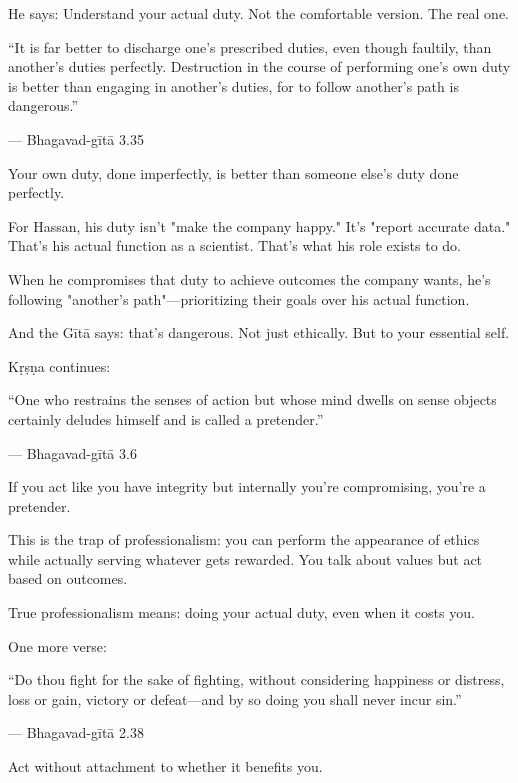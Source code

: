 \documentclass[11pt,twoside]{book}
\begin{document}
He says: Understand your actual duty. Not the comfortable version. The real one.

\begin{pullquote}
``It is far better to discharge one's prescribed duties, even though faultily, than another's duties perfectly. Destruction in the course of performing one's own duty is better than engaging in another's duties, for to follow another's path is dangerous.''

--- Bhagavad-gītā 3.35
\end{pullquote}

Your own duty, done imperfectly, is better than someone else's duty done perfectly.

For Hassan, his duty isn't "make the company happy." It's "report accurate data." That's his actual function as a scientist. That's what his role exists to do.

When he compromises that duty to achieve outcomes the company wants, he's following "another's path"—prioritizing their goals over his actual function.

And the Gītā says: that's dangerous. Not just ethically. But to your essential self.

Kṛṣṇa continues:

\begin{pullquote}
``One who restrains the senses of action but whose mind dwells on sense objects certainly deludes himself and is called a pretender.''

--- Bhagavad-gītā 3.6
\end{pullquote}

If you act like you have integrity but internally you're compromising, you're a pretender.

This is the trap of professionalism: you can perform the appearance of ethics while actually serving whatever gets rewarded. You talk about values but act based on outcomes.

True professionalism means: doing your actual duty, even when it costs you.

One more verse:

\begin{pullquote}
``Do thou fight for the sake of fighting, without considering happiness or distress, loss or gain, victory or defeat—and by so doing you shall never incur sin.''

--- Bhagavad-gītā 2.38
\end{pullquote}

Act without attachment to whether it benefits you.
\end{document}
